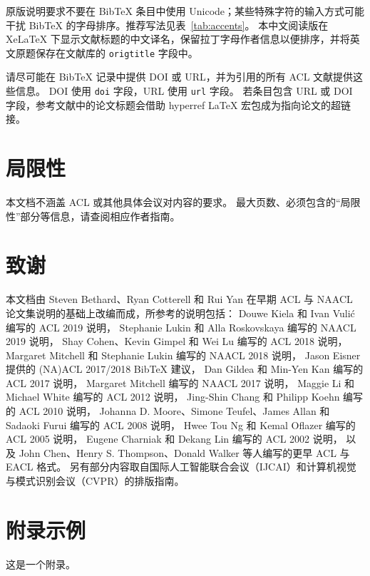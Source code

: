\documentclass[11pt]{article}
\begin{document}
原版说明要求不要在 Bib\TeX{} 条目中使用 Unicode；某些特殊字符的输入方式可能干扰 Bib\TeX{} 的字母排序。推荐写法见表~\ref{tab:accents}。
本中文阅读版在 Xe\LaTeX{} 下显示文献标题的中文译名，保留拉丁字母作者信息以便排序，并将英文原题保存在文献库的 \texttt{origtitle} 字段中。

请尽可能在 Bib\TeX{} 记录中提供 DOI 或 URL，并为引用的所有 ACL 文献提供这些信息。
DOI 使用 \verb|doi| 字段，URL 使用 \verb|url| 字段。
若条目包含 URL 或 DOI 字段，参考文献中的论文标题会借助 hyperref \LaTeX{} 宏包成为指向论文的超链接。

\section*{局限性}

本文档不涵盖 ACL 或其他具体会议对内容的要求。
最大页数、必须包含的“局限性”部分等信息，请查阅相应作者指南。

\section*{致谢}

本文档由 Steven Bethard、Ryan Cotterell 和 Rui Yan 在早期 ACL 与 NAACL 论文集说明的基础上改编而成，所参考的说明包括：
Douwe Kiela 和 Ivan Vuli\'{c} 编写的 ACL 2019 说明，
Stephanie Lukin 和 Alla Roskovskaya 编写的 NAACL 2019 说明，
Shay Cohen、Kevin Gimpel 和 Wei Lu 编写的 ACL 2018 说明，
Margaret Mitchell 和 Stephanie Lukin 编写的 NAACL 2018 说明，
Jason Eisner 提供的 (NA)ACL 2017/2018 Bib\TeX{} 建议，
Dan Gildea 和 Min-Yen Kan 编写的 ACL 2017 说明，
Margaret Mitchell 编写的 NAACL 2017 说明，
Maggie Li 和 Michael White 编写的 ACL 2012 说明，
Jing-Shin Chang 和 Philipp Koehn 编写的 ACL 2010 说明，
Johanna D. Moore、Simone Teufel、James Allan 和 Sadaoki Furui 编写的 ACL 2008 说明，
Hwee Tou Ng 和 Kemal Oflazer 编写的 ACL 2005 说明，
Eugene Charniak 和 Dekang Lin 编写的 ACL 2002 说明，
以及 John Chen、Henry S. Thompson、Donald Walker 等人编写的更早 ACL 与 EACL 格式。
另有部分内容取自国际人工智能联合会议（IJCAI）和计算机视觉与模式识别会议（CVPR）的排版指南。

%


\appendix
\section{附录示例}
\label{sec:appendix}

这是一个附录。
\end{document}
